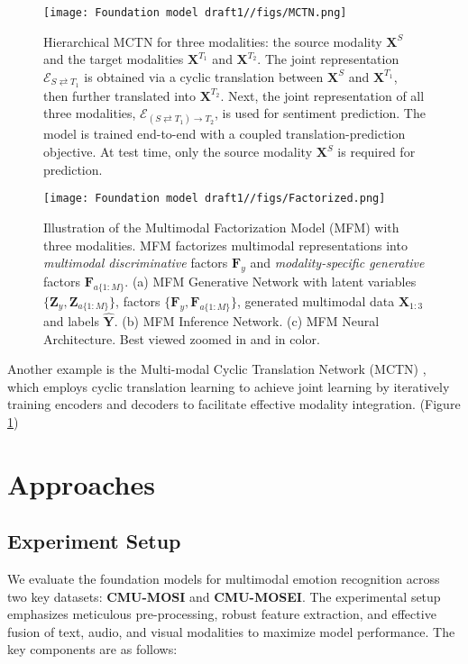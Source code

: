 \documentclass{article}
\begin{document}
\begin{figure}[h]
    \centering
    \texttt{[image: Foundation model draft1//figs/MCTN.png]}
    \caption{Hierarchical MCTN for three modalities: the source modality $\mathbf{X}^S$ and the target modalities $\mathbf{X}^{T_1}$ and $\mathbf{X}^{T_2}$. The joint representation $\mathcal{E}_{S \rightleftarrows T_1}$ is obtained via a cyclic translation between $\mathbf{X}^S$ and $\mathbf{X}^{T_1}$, then further translated into $\mathbf{X}^{T_2}$. Next, the joint representation of all three modalities, $\mathcal{E}_{(S \rightleftarrows T_1) \rightarrow T_2}$, is used for sentiment prediction. The model is trained end-to-end with a coupled translation-prediction objective. At test time, only the source modality $\mathbf{X}^S$ is required for prediction. \cite{Pham2019MCTN} }
    \label{fig:MCTN}
\end{figure}

\begin{figure*}[h]
    \texttt{[image: Foundation model draft1//figs/Factorized.png]}
\caption{Illustration of the Multimodal Factorization Model (MFM) with three modalities. MFM factorizes multimodal representations into \textit{multimodal discriminative} factors $\mathbf{F}_y$ and \textit{modality-specific generative} factors $\mathbf{F}_{a\{1:M\}}$. (a) MFM Generative Network with latent variables $\{\mathbf{Z}_y, \mathbf{Z}_{a\{1:M\}}\}$, factors $\{\mathbf{F}_y, \mathbf{F}_{a\{1:M\}}\}$, generated multimodal data $\hat{\mathbf{X}}_{1:3}$ and labels $\hat{\mathbf{Y}}$. (b) MFM Inference Network. (c) MFM Neural Architecture. Best viewed zoomed in and in color. \cite{FactorizedMult}}
    \label{fig:factorized}
\end{figure*}

Another example is the Multi-modal Cyclic Translation Network (MCTN) \cite{Pham2019MCTN}, which employs cyclic translation learning to achieve joint learning by iteratively training encoders and decoders to facilitate effective modality integration. (Figure \ref{fig:MCTN})


\section{Approaches}

\subsection{Experiment Setup}
We evaluate the foundation models for multimodal emotion recognition across two key datasets: \textbf{CMU-MOSI} and \textbf{CMU-MOSEI}. The experimental setup emphasizes meticulous pre-processing, robust feature extraction, and effective fusion of text, audio, and visual modalities to maximize model performance. The key components are as follows:
\end{document}
